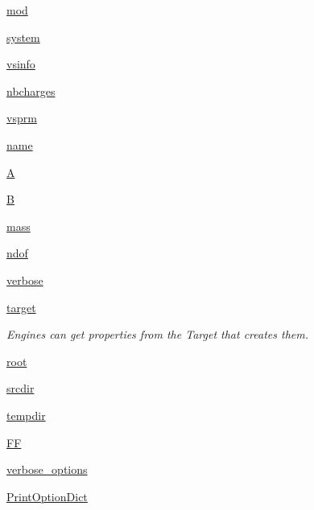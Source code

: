 \begin{DoxyCompactItemize}
\hyperlink{classforcebalance_1_1openmmio_1_1OpenMM_ab736c4bdecb2e83979c6372829a68e73}{mod}
\item 
\hyperlink{classforcebalance_1_1openmmio_1_1OpenMM_a581ef690c2bc0e0fa239b7d36cc7d790}{system}
\item 
\hyperlink{classforcebalance_1_1openmmio_1_1OpenMM_a599ce591c5f66aabf1b45dad7798397b}{vsinfo}
\item 
\hyperlink{classforcebalance_1_1openmmio_1_1OpenMM_ab874ef6b2f3aa456f9f63b46ee198035}{nbcharges}
\item 
\hyperlink{classforcebalance_1_1openmmio_1_1OpenMM_ab8ec6fc24b2b1b0264c384ffdf14b5e2}{vsprm}
\item 
\hyperlink{classforcebalance_1_1openmmio_1_1OpenMM_a2ceaa15535cbb7305494984a47687090}{name}
\item 
\hyperlink{classforcebalance_1_1openmmio_1_1OpenMM_a4c4ac53fe7f741ae7bbf55cddf309fbb}{A}
\item 
\hyperlink{classforcebalance_1_1openmmio_1_1OpenMM_ae96e5d45681a34fbda6781d27845409c}{B}
\item 
\hyperlink{classforcebalance_1_1openmmio_1_1OpenMM_ab0547b7b7f457bd0619a0d18c9fe85c2}{mass}
\item 
\hyperlink{classforcebalance_1_1openmmio_1_1OpenMM_ac2a2dd00a4f7c12d79f93eaa66dd8dab}{ndof}
\item 
\hyperlink{classforcebalance_1_1engine_1_1Engine_a29b97ebf8984e50fd19eb831715ab659}{verbose}
\item 
\hyperlink{classforcebalance_1_1engine_1_1Engine_a1fdd29fbd127cba331326a3557558e2a}{target}
\begin{DoxyCompactList}\small\item\em Engines can get properties from the Target that creates them. \end{DoxyCompactList}\item 
\hyperlink{classforcebalance_1_1engine_1_1Engine_a82e9382a3316d3e26ef29efb58db4a00}{root}
\item 
\hyperlink{classforcebalance_1_1engine_1_1Engine_ad9c499329de6299f0b8acf898d71e7d5}{srcdir}
\item 
\hyperlink{classforcebalance_1_1engine_1_1Engine_a7bb2deae7ee926f0df7758a92b382515}{tempdir}
\item 
\hyperlink{classforcebalance_1_1engine_1_1Engine_aeb55142568e89f7a92d745e04ec3c964}{F\-F}
\item 
\hyperlink{classforcebalance_1_1BaseClass_afd68efa29ccd2f320f4cf82198214aac}{verbose\-\_\-options}
\item 
\hyperlink{classforcebalance_1_1BaseClass_afc6659278497d7245bc492ecf405ccae}{Print\-Option\-Dict}
\end{DoxyCompactItemize}


